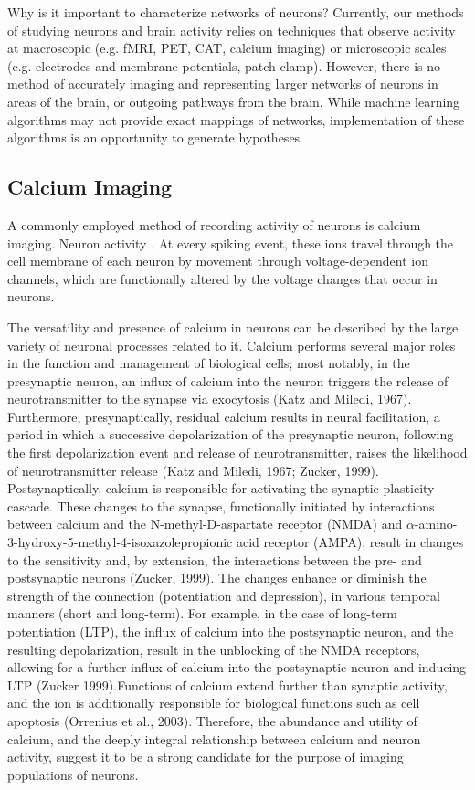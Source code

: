 \documentclass[11pt]{article}
\begin{document}
Why is it important to characterize networks of neurons? Currently, our methods of studying neurons and brain activity relies on techniques that observe activity at macroscopic (e.g. fMRI, PET, CAT, calcium imaging) or microscopic scales (e.g. electrodes and membrane potentials, patch clamp). However, there is no method of accurately imaging and representing larger networks of neurons in areas of the brain, or outgoing pathways from the brain. While machine learning algorithms may not provide exact mappings of networks, implementation of these algorithms is an opportunity to generate hypotheses.\par

\subsection{Calcium Imaging}
A commonly employed method of recording activity of neurons is calcium imaging. Neuron activity . At every spiking event, these ions travel through the cell membrane of each neuron by movement through voltage-dependent ion channels, which are functionally altered by the voltage changes that occur in neurons.\par

The versatility and presence of calcium in neurons can be described by the large variety of neuronal processes related to it. Calcium performs several major roles in the function and management of biological cells; most notably, in the presynaptic neuron, an influx of calcium into the neuron triggers the release of neurotransmitter to the synapse via exocytosis (Katz and Miledi, 1967). Furthermore, presynaptically, residual calcium results in neural facilitation, a period in which a successive depolarization of the presynaptic neuron, following the first depolarization event and release of neurotransmitter, raises the likelihood of neurotransmitter release (Katz and Miledi, 1967; Zucker, 1999). Postsynaptically, calcium is responsible for activating the synaptic plasticity cascade. These changes to the synapse, functionally initiated by interactions between calcium and the N-methyl-D-aspartate receptor (NMDA) and $\alpha$-amino-3-hydroxy-5-methyl-4-isoxazolepropionic acid receptor (AMPA), result in changes to the sensitivity and, by extension, the interactions between the pre- and postsynaptic neurons (Zucker, 1999). The changes enhance or diminish the strength of the connection (potentiation and depression), in various temporal manners (short and long-term). For example, in the case of long-term potentiation (LTP), the influx of calcium into the postsynaptic neuron, and the resulting depolarization, result in the unblocking of the NMDA receptors, allowing for a further influx of calcium into the postsynaptic neuron and inducing LTP (Zucker 1999).Functions of calcium extend further than synaptic activity, and the ion is additionally responsible for biological functions such as cell apoptosis (Orrenius et al., 2003). Therefore, the abundance and utility of calcium, and the deeply integral relationship between calcium and neuron activity, suggest it to be a strong candidate for the purpose of imaging populations of neurons.\par
\end{document}

